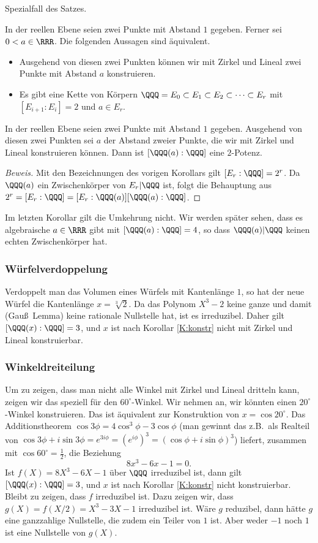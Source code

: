\documentclass[12pt,a4paper,twoside]{article}
\begin{document}
Spezialfall des Satzes.
\begin{Korollar}\label{K:konstr}
  In der reellen Ebene seien zwei Punkte mit Abstand $1$ gegeben. Ferner sei
  $0<a\in\RRR$. Die folgenden Aussagen sind \"aquivalent.
  \begin{itemize}
  \item[(i)] Ausgehend von diesen zwei Punkten k\"onnen wir mit Zirkel und
  Lineal zwei Punkte mit Abstand $a$ konstruieren.
\item[(ii)] Es gibt eine Kette von K\"orpern $\QQQ=E_0\subset E_1\subset
  E_2\subset\dots\subset E_r$ mit $[E_{i+1}:E_{i}]=2$ und $a\in E_r$.
  \end{itemize}
\end{Korollar}
\begin{Korollar}
  In der reellen Ebene seien zwei Punkte mit Abstand $1$ gegeben. Ausgehend
  von diesen zwei Punkten sei $a$ der Abstand zweier Punkte, die wir mit
  Zirkel und Lineal konstruieren k\"onnen. Dann ist $[\QQQ(a):\QQQ]$ eine
  $2$-Potenz.
\end{Korollar}
\begin{proof}[Beweis]
  Mit den Bezeichnungen des vorigen Korollars gilt $[E_r:\QQQ]=2^r$. Da
  $\QQQ(a)$ ein Zwischenk\"orper von $E_r|\QQQ$ ist, folgt die Behauptung aus
  $2^r=[E_r:\QQQ]=[E_r:\QQQ(a)][\QQQ(a):\QQQ]$.
\end{proof}
\begin{Bemerkung*}
  Im letzten Korollar gilt die Umkehrung nicht. Wir werden sp\"ater sehen,
  dass es algebraische $a\in\RRR$ gibt mit $[\QQQ(a):\QQQ]=4$, so dass
  $\QQQ(a)|\QQQ$ keinen echten Zwischenk\"orper hat.
\end{Bemerkung*}
\subsubsection{W\"urfelverdoppelung}
Verdoppelt man das Volumen eines W\"urfels mit Kantenl\"ange $1$, so hat der
neue W\"urfel die Kantenl\"ange $x=\sqrt[3]{2}$. Da das Polynom $X^3-2$ keine
ganze und damit (Gau\ss\ Lemma) keine rationale Nullstelle hat, ist es
irreduzibel. Daher gilt $[\QQQ(x):\QQQ]=3$, und $x$ ist nach Korollar
\ref{K:konstr} nicht mit Zirkel und Lineal konstruierbar.
\subsubsection{Winkeldreiteilung}
Um zu zeigen, dass man nicht alle Winkel mit Zirkel und Lineal dritteln kann,
zeigen wir das speziell f\"ur den $60^\circ$-Winkel.  Wir nehmen an, wir
k\"onnten einen $20^\circ$-Winkel konstruieren. Das ist \"aquivalent zur
Konstruktion von $x=\cos 20^\circ$. Das Additionstheorem $\cos
3\phi=4\cos^3\phi-3\cos\phi$ (man gewinnt das z.B.\ als Realteil von
$\cos3\phi+i\sin3\phi=e^{3i\phi}=(e^{i\phi})^3=(\cos\phi+i\sin\phi)^3$)
liefert, zusammen mit $\cos60^\circ=\frac{1}{2}$, die Beziehung
\[
8x^3-6x-1=0.
\]
Ist $f(X)=8X^3-6X-1$ \"uber $\QQQ$ irreduzibel ist, dann gilt
$[\QQQ(x):\QQQ]=3$, und $x$ ist nach Korollar \ref{K:konstr} nicht
konstruierbar. Bleibt zu zeigen, dass $f$ irreduzibel ist. Dazu zeigen wir,
dass $g(X)=f(X/2)=X^3-3X-1$ irreduzibel ist. W\"are $g$ reduzibel, dann
h\"atte $g$ eine ganzzahlige Nullstelle, die zudem ein Teiler von $1$ ist.
Aber weder $-1$ noch $1$ ist eine Nullstelle von $g(X)$.
\end{document}
